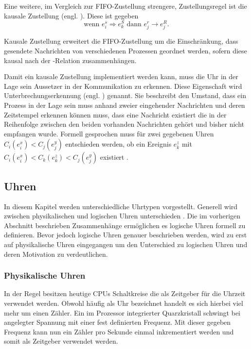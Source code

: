 Eine weitere, im Vergleich zur FIFO-Zustellung strengere, Zustellungsregel ist die kausale Zustellung (engl. ). Diese ist gegeben 
\begin{equation*}
    \text{wenn } e_i^s \Rightarrow e_k^S \text{ dann } e_j^r \rightarrow e_j^R.
\end{equation*}

Kausale Zustellung erweitert die FIFO-Zustellung um die Einschränkung, dass gesendete Nachrichten von verschiedenen Prozessen geordnet werden, sofern diese kausal nach der -Relation zusammenhängen.

Damit ein kausale Zustellung implementiert werden kann, muss die Uhr in der Lage sein Aussetzer in der Kommunikation zu erkennen.
Diese Eigenschaft wird Unterbrechungserkennung (engl. ) genannt.
Sie beschreibt den Umstand, dass ein Prozess in der Lage sein muss anhand zweier eingehender Nachrichten und deren Zeitstempel erkennen können muss, dass eine Nachricht existiert die in der Reihenfolge zwischen den beiden vorhanden Nachrichten gehört und bisher nicht empfangen wurde.
Formell gesprochen muss für zwei gegebenen Uhren $C_i(e_i^x) < C_j(e_j^y)$ entschieden werden, ob ein Ereignis $e_k^z$ mit $C_i(e_i^x)<C_k(e_k^z)<C_j(e_j^y)$ existiert \cite{babaoglu1993consistent}.

\subsection{Uhren}
In diesem Kapitel werden unterschiedliche Uhrtypen vorgestellt.
Generell wird zwischen physikalischen und logischen Uhren unterschieden \cite{Tanenbaum2007}.
Die im vorherigen Abschnitt beschrieben Zusammenhänge ermöglichen es logische Uhren formell zu definieren.
Bevor jedoch logische Uhren genauer beschrieben werden, wird zu erst auf physikalische Uhren eingegangen um den Unterschied zu logischen Uhren und deren Motivation zu verdeutlichen.

\subsubsection{Physikalische Uhren}
In der Regel besitzen heutige CPUs Schaltkreise die als Zeitgeber für die Uhrzeit verwendet werden.
Obwohl häufig als Uhr bezeichnet handelt es sich hierbei viel mehr um einen Zähler.
Ein im Prozessor integrierter Quarzkristall schwingt bei angelegter Spannung mit einer fest definierten Frequenz.
Mit dieser gegeben Frequenz kann nun ein Zähler pro Sekunde einmal inkrementiert werden und somit als Zeitgeber verwendet werden.

